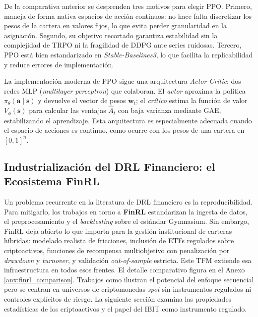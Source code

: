 \documentclass[IB,a4paper]{TFUOC}
\begin{document}
De la comparativa anterior se desprenden tres motivos para elegir PPO. Primero, maneja de forma nativa espacios de acción continuos: no hace falta discretizar los pesos de la cartera en valores fijos, lo que evita perder granularidad en la asignación. Segundo, su objetivo recortado garantiza estabilidad sin la complejidad de TRPO \citep{schulman2015trpo} ni la fragilidad de DDPG \citep{lillicrap2015ddpg} ante series ruidosas. Tercero, PPO está bien estandarizado en \textit{Stable-Baselines3}, lo que facilita la replicabilidad y reduce errores de implementación.

La implementación moderna de PPO sigue una arquitectura \textit{Actor-Critic}: dos redes MLP (\textit{multilayer perceptron}) que colaboran. El \textit{actor} aproxima la política $\pi_{\theta}(\mathbf{a}\mid\mathbf{s})$ y devuelve el vector de pesos $\mathbf{w}_t$; el \textit{crítico} estima la función de valor $V_{\phi}(\mathbf{s})$ para calcular las ventajas $\hat{A}_t$ con baja varianza mediante GAE, estabilizando el aprendizaje. Esta arquitectura es especialmente adecuada cuando el espacio de acciones es continuo, como ocurre con los pesos de una cartera en $[0,1]^{n}$.

\subsection{Industrialización del DRL Financiero: el Ecosistema FinRL}

Un problema recurrente en la literatura de DRL financiero es la reproducibilidad. Para mitigarlo, los trabajos en torno a \textbf{FinRL} \citep{liu2018finrl,liu2021finrl} estandarizan la ingesta de datos, el preprocesamiento y el \textit{backtesting} sobre el estándar Gymnasium. Sin embargo, FinRL deja abierto lo que importa para la gestión institucional de carteras híbridas: modelado realista de fricciones, inclusión de ETFs regulados sobre criptoactivos, funciones de recompensa multiobjetivo con penalización por \textit{drawdown} y \textit{turnover}, y validación \textit{out-of-sample} estricta. Este TFM extiende esa infraestructura en todos esos frentes. El detalle comparativo figura en el Anexo \ref{anx:finrl_comparison}. Trabajos como \citet{jiang2017drl} ilustran el potencial del enfoque secuencial pero se centran en universos de criptomonedas \textit{spot} sin instrumentos regulados ni controles explícitos de riesgo. La siguiente sección examina las propiedades estadísticas de los criptoactivos y el papel del IBIT como instrumento regulado.
\end{document}
